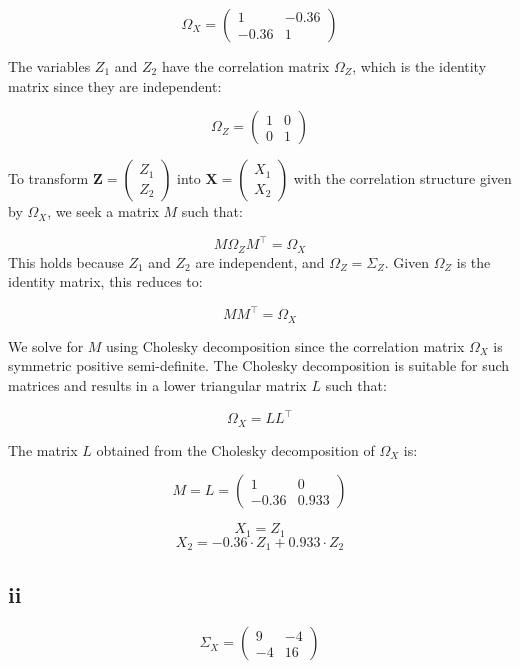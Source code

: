 \documentclass{article}
\begin{document}
\[
    \Omega_X = \begin{pmatrix} 1 & -0.36 \\ -0.36 & 1 \end{pmatrix}
\]

The variables $Z_1$ and $Z_2$ have the correlation matrix $\Omega_Z$, which is the identity matrix since they are independent:

\[
    \Omega_Z = \begin{pmatrix} 1 & 0 \\ 0 & 1 \end{pmatrix}
\]

To transform $\mathbf{Z} = \begin{pmatrix} Z_1 \\ Z_2 \end{pmatrix}$ into $\mathbf{X} = \begin{pmatrix} X_1 \\ X_2 \end{pmatrix}$ with the correlation structure given by $\Omega_X$, we seek a matrix $M$ such that:

\[
    M \Omega_Z M^\top = \Omega_X
\]
This holds because $Z_1$ and $Z_2$ are independent, and $\Omega_Z = \Sigma_Z$. Given $\Omega_Z$ is the identity matrix, this reduces to:

\[
    M M^\top = \Omega_X
\]

We solve for \(M\) using Cholesky decomposition since the correlation matrix \(\Omega_X\) is symmetric positive semi-definite. The Cholesky decomposition is suitable for such matrices and results in a lower triangular matrix \(L\) such that:

\[
    \Omega_X = L L^\top
\]

The matrix \(L\) obtained from the Cholesky decomposition of \(\Omega_X\) is:

\[
    M=L = \begin{pmatrix}
        1     & 0     \\
        -0.36 & 0.933
    \end{pmatrix}
\]

\[
    X_1 = Z_1
\]
\[
    X_2 = -0.36 \cdot Z_1 + 0.933 \cdot Z_2
\]
\subsection*{ii}
\[
    \Sigma_X = \begin{pmatrix} 9 & -4 \\ -4 & 16 \end{pmatrix}
\]
\end{document}
